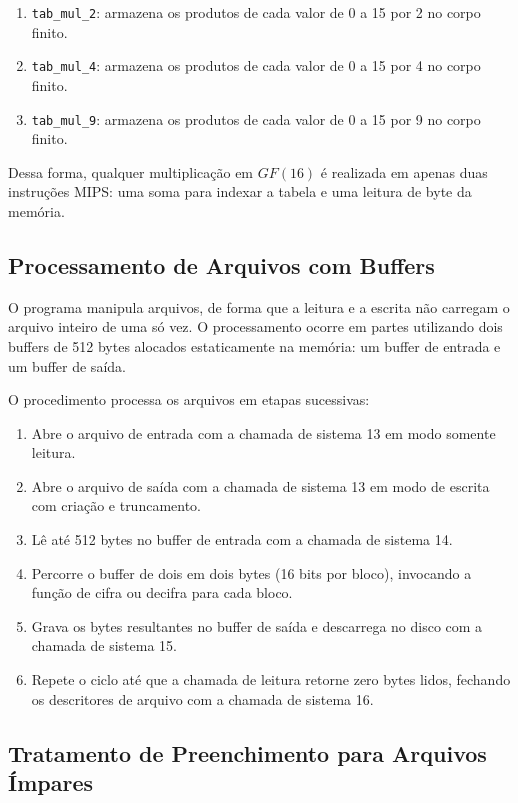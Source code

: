 \documentclass[12pt,a4paper]{article}
\begin{document}
\begin{enumerate}
    \item \texttt{tab\_mul\_2}: armazena os produtos de cada valor de 0 a 15 por 2 no corpo finito.
    \item \texttt{tab\_mul\_4}: armazena os produtos de cada valor de 0 a 15 por 4 no corpo finito.
    \item \texttt{tab\_mul\_9}: armazena os produtos de cada valor de 0 a 15 por 9 no corpo finito.
\end{enumerate}

Dessa forma, qualquer multiplicação em $GF(16)$ é realizada em apenas duas instruções MIPS: uma soma para indexar a tabela e uma leitura de byte da memória.

\subsection{Processamento de Arquivos com Buffers}

O programa manipula arquivos, de forma que a leitura e a escrita não carregam o arquivo inteiro de uma só vez. O processamento ocorre em partes utilizando dois buffers de 512 bytes alocados estaticamente na memória: um buffer de entrada e um buffer de saída.

O procedimento processa os arquivos em etapas sucessivas:

\begin{enumerate}
    \item Abre o arquivo de entrada com a chamada de sistema 13 em modo somente leitura.
    \item Abre o arquivo de saída com a chamada de sistema 13 em modo de escrita com criação e truncamento.
    \item Lê até 512 bytes no buffer de entrada com a chamada de sistema 14.
    \item Percorre o buffer de dois em dois bytes (16 bits por bloco), invocando a função de cifra ou decifra para cada bloco.
    \item Grava os bytes resultantes no buffer de saída e descarrega no disco com a chamada de sistema 15.
    \item Repete o ciclo até que a chamada de leitura retorne zero bytes lidos, fechando os descritores de arquivo com a chamada de sistema 16.
\end{enumerate}

\subsection{Tratamento de Preenchimento para Arquivos Ímpares}
\end{document}
